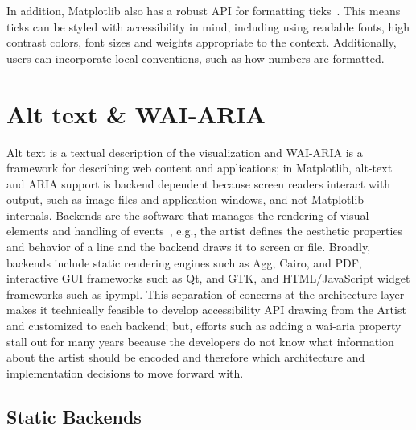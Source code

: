 \documentclass{vgtc}                          %
\begin{document}
In addition, Matplotlib also has a robust API for formatting ticks~\cite{MatplotlibtickerMatplotlib3103}. This means ticks can be styled with accessibility in mind, including using readable fonts, high contrast colors, font sizes and weights appropriate to the context. Additionally, users can incorporate local conventions, such as how numbers are formatted.


\section{Alt text \& WAI-ARIA}
Alt text is a textual description of the visualization and WAI-ARIA is a framework for describing web content and applications\cite{WebAIMIntroductionARIA}; in Matplotlib, alt-text and ARIA support is backend dependent because screen readers interact with output, such as image files and application windows, and not Matplotlib internals. Backends are the software that manages the rendering of visual elements and handling of events~\cite{BackendsMatplotlib3110}, e.g., the artist defines the aesthetic properties and behavior of a line and the backend draws it to screen or file. Broadly, backends include static rendering engines such as Agg, Cairo, and PDF, interactive GUI frameworks such as Qt, and GTK, and HTML/JavaScript widget frameworks such as ipympl. This separation of concerns at the architecture layer makes it technically feasible to develop accessibility API drawing from the Artist and customized to each backend; but, efforts such as adding a wai-aria property~\cite{ImproveAccessibilityFigures,AddWaiariaProperty} stall out for many years because the developers do not know what information about the artist should be encoded and therefore which architecture and implementation decisions to move forward with.

\subsection{Static Backends}
\end{document}
